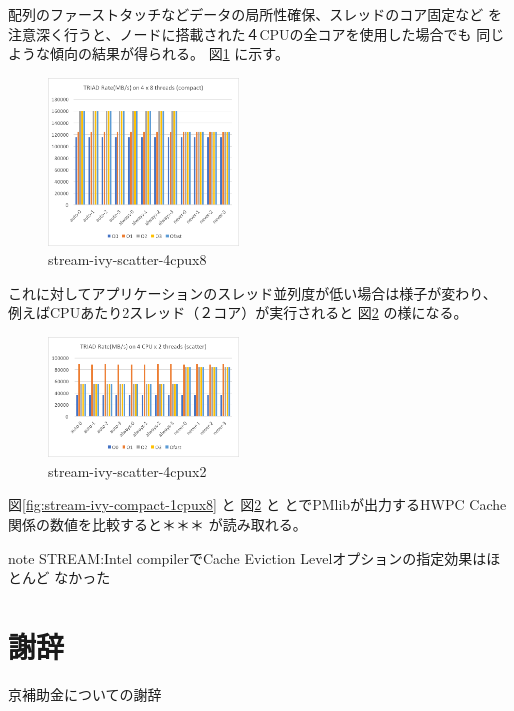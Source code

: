 \documentclass[submit,techrep,noauthor]{ipsj}
\begin{document}
配列のファーストタッチなどデータの局所性確保、スレッドのコア固定など
を注意深く行うと、ノードに搭載された４CPUの全コアを使用した場合でも
同じような傾向の結果が得られる。
図\ref{fig:stream-ivy-scatter-4cpux8} に示す。\\

\begin{figure}[tb]
\centering\includegraphics[width=0.45\textwidth]{figs/stream-ivy-scatter-4cpux8.png}
\caption{stream-ivy-scatter-4cpux8}
\label{fig:stream-ivy-scatter-4cpux8}
\end{figure}

これに対してアプリケーションのスレッド並列度が低い場合は様子が変わり、
例えばCPUあたり2スレッド（２コア）が実行されると
図\ref{fig:stream-ivy-scatter-4cpux2} の様になる。\\

\begin{figure}[tb]
\centering\includegraphics[width=0.45\textwidth]{figs/stream-ivy-scatter-4cpux2.png}
\caption{stream-ivy-scatter-4cpux2}
\label{fig:stream-ivy-scatter-4cpux2}
\end{figure}

図\ref{fig:stream-ivy-compact-1cpux8} と
図\ref{fig:stream-ivy-scatter-4cpux2} と
とでPMlibが出力するHWPC Cache関係の数値を比較すると＊＊＊
が読み取れる。


{ \color{blue} \par
note STREAM:Intel compilerでCache Eviction Levelオプションの指定効果はほとんど
なかった
} \par


\section{謝辞}
京補助金についての謝辞



\end{document}
